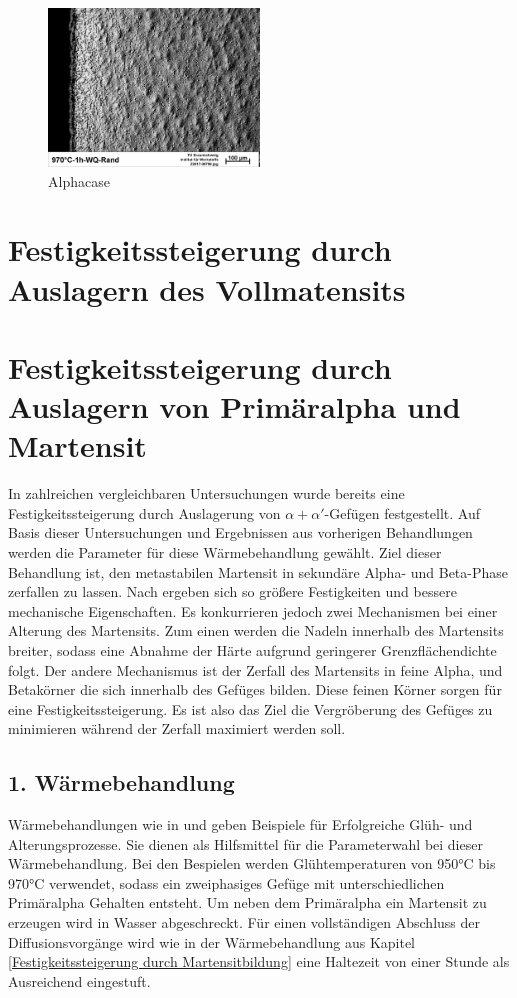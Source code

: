 \documentclass[a4paper, 11pt]{tubsreprt}
\begin{document}
\begin{figure}
\centering
\includegraphics[width=0.5\textwidth]{Bilder/alphacase.jpg}
\caption{Alphacase}
\label{alphacase}
\end{figure}  




\section{Festigkeitssteigerung durch Auslagern des Vollmatensits}
\section{Festigkeitssteigerung durch Auslagern von Primäralpha und Martensit}\label{Primäralpha und martensit}
In zahlreichen vergleichbaren Untersuchungen wurde bereits eine Festigkeitssteigerung durch Auslagerung von $\alpha + \alpha'$-Gefügen festgestellt. Auf Basis dieser Untersuchungen und Ergebnissen aus vorherigen Behandlungen werden die Parameter für diese Wärmebehandlung gewählt. Ziel dieser Behandlung ist, den metastabilen Martensit in sekundäre Alpha- und Beta-Phase zerfallen zu lassen. Nach \cite{Gilbert2004} ergeben sich so größere Festigkeiten und bessere mechanische Eigenschaften. Es konkurrieren jedoch zwei Mechanismen bei einer Alterung des Martensits. Zum einen werden die Nadeln innerhalb des Martensits breiter, sodass eine Abnahme der Härte aufgrund geringerer Grenzflächendichte folgt. Der andere Mechanismus ist der Zerfall des Martensits in feine Alpha, und Betakörner die sich innerhalb des Gefüges bilden. Diese feinen Körner sorgen für eine Festigkeitssteigerung. Es ist also das Ziel die Vergröberung des Gefüges zu minimieren während der Zerfall maximiert werden soll. 
\subsection{1. Wärmebehandlung}
Wärmebehandlungen wie in \cite{Gilbert2004} und \cite{Chen2008} geben Beispiele für Erfolgreiche Glüh- und Alterungsprozesse. Sie dienen als Hilfsmittel für die Parameterwahl bei dieser Wärmebehandlung. Bei den Bespielen werden Glühtemperaturen von 950°C bis 970°C verwendet, sodass ein zweiphasiges Gefüge mit unterschiedlichen Primäralpha Gehalten entsteht. Um neben dem Primäralpha ein Martensit zu erzeugen wird in Wasser abgeschreckt. Für einen vollständigen Abschluss der Diffusionsvorgänge wird wie in der Wärmebehandlung aus Kapitel \ref{Festigkeitssteigerung durch Martensitbildung} eine Haltezeit von einer Stunde als Ausreichend eingestuft.
\end{document}
